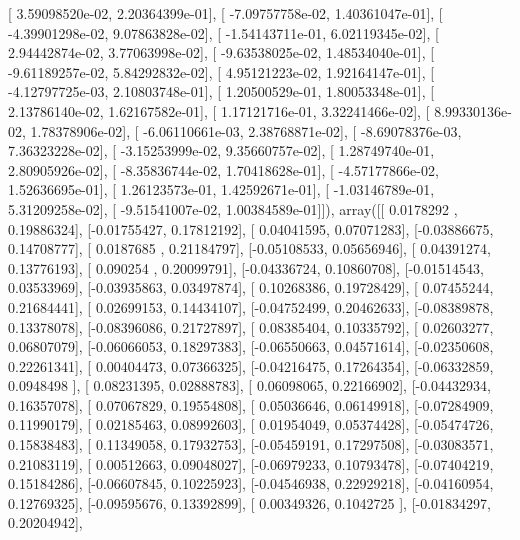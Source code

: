 \documentclass{article}
\begin{document}
       [  3.59098520e-02,   2.20364399e-01],
       [ -7.09757758e-02,   1.40361047e-01],
       [ -4.39901298e-02,   9.07863828e-02],
       [ -1.54143711e-01,   6.02119345e-02],
       [  2.94442874e-02,   3.77063998e-02],
       [ -9.63538025e-02,   1.48534040e-01],
       [ -9.61189257e-02,   5.84292832e-02],
       [  4.95121223e-02,   1.92164147e-01],
       [ -4.12797725e-03,   2.10803748e-01],
       [  1.20500529e-01,   1.80053348e-01],
       [  2.13786140e-02,   1.62167582e-01],
       [  1.17121716e-01,   3.32241466e-02],
       [  8.99330136e-02,   1.78378906e-02],
       [ -6.06110661e-03,   2.38768871e-02],
       [ -8.69078376e-03,   7.36323228e-02],
       [ -3.15253999e-02,   9.35660757e-02],
       [  1.28749740e-01,   2.80905926e-02],
       [ -8.35836744e-02,   1.70418628e-01],
       [ -4.57177866e-02,   1.52636695e-01],
       [  1.26123573e-01,   1.42592671e-01],
       [ -1.03146789e-01,   5.31209258e-02],
       [ -9.51541007e-02,   1.00384589e-01]]), array([[ 0.0178292 ,  0.19886324],
       [-0.01755427,  0.17812192],
       [ 0.04041595,  0.07071283],
       [-0.03886675,  0.14708777],
       [ 0.0187685 ,  0.21184797],
       [-0.05108533,  0.05656946],
       [ 0.04391274,  0.13776193],
       [ 0.090254  ,  0.20099791],
       [-0.04336724,  0.10860708],
       [-0.01514543,  0.03533969],
       [-0.03935863,  0.03497874],
       [ 0.10268386,  0.19728429],
       [ 0.07455244,  0.21684441],
       [ 0.02699153,  0.14434107],
       [-0.04752499,  0.20462633],
       [-0.08389878,  0.13378078],
       [-0.08396086,  0.21727897],
       [ 0.08385404,  0.10335792],
       [ 0.02603277,  0.06807079],
       [-0.06066053,  0.18297383],
       [-0.06550663,  0.04571614],
       [-0.02350608,  0.22261341],
       [ 0.00404473,  0.07366325],
       [-0.04216475,  0.17264354],
       [-0.06332859,  0.0948498 ],
       [ 0.08231395,  0.02888783],
       [ 0.06098065,  0.22166902],
       [-0.04432934,  0.16357078],
       [ 0.07067829,  0.19554808],
       [ 0.05036646,  0.06149918],
       [-0.07284909,  0.11990179],
       [ 0.02185463,  0.08992603],
       [ 0.01954049,  0.05374428],
       [-0.05474726,  0.15838483],
       [ 0.11349058,  0.17932753],
       [-0.05459191,  0.17297508],
       [-0.03083571,  0.21083119],
       [ 0.00512663,  0.09048027],
       [-0.06979233,  0.10793478],
       [-0.07404219,  0.15184286],
       [-0.06607845,  0.10225923],
       [-0.04546938,  0.22929218],
       [-0.04160954,  0.12769325],
       [-0.09595676,  0.13392899],
       [ 0.00349326,  0.1042725 ],
       [-0.01834297,  0.20204942],
\end{document}
